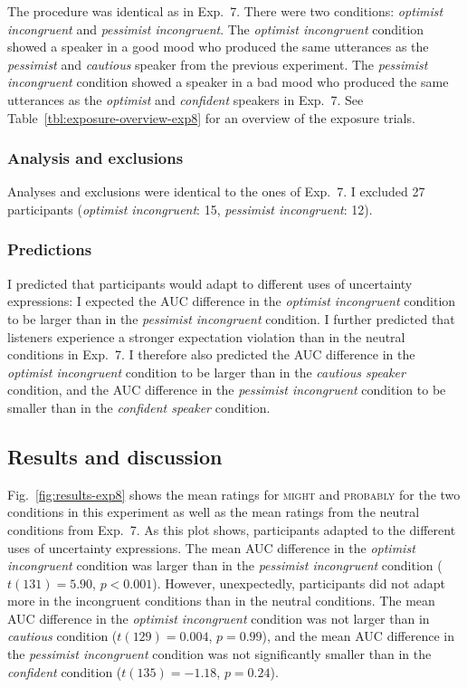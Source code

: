 The procedure was identical as in Exp.~7. There were two conditions: \textit{optimist incongruent} and \textit{pessimist incongruent}. The \textit{optimist incongruent} condition showed a speaker in a good mood who produced the same utterances as the \textit{pessimist} and \textit{cautious} speaker from the previous experiment. The \textit{pessimist incongruent} condition showed a speaker in a bad mood who produced the same utterances as the \textit{optimist} and \textit{confident} speakers in Exp.~7. See Table~\ref{tbl:exposure-overview-exp8} for an overview of the exposure trials.

\subsubsection{Analysis and exclusions}

Analyses and exclusions were identical to the ones of Exp.~7. I excluded 27 participants (\textit{optimist incongruent}: 15, \textit{pessimist incongruent}: 12).

\subsubsection{Predictions}

I predicted that participants would adapt to different uses of uncertainty expressions: I expected the AUC difference in the \textit{optimist incongruent} condition to be larger than in the \textit{pessimist incongruent} condition. I further predicted that listeners experience a stronger expectation violation than in the neutral conditions in Exp.~7. I therefore also predicted the AUC difference in the \textit{optimist incongruent} condition to be larger than in the \textit{cautious speaker} condition, and the AUC difference in the \textit{pessimist incongruent} condition to be smaller than in the \textit{confident speaker} condition.

\subsection{Results and discussion}

Fig.~\ref{fig:results-exp8} shows the mean ratings for \textsc{might} and \textsc{probably} for the two conditions in this experiment as well as the mean ratings from the neutral conditions from Exp.~7. As this plot shows, participants adapted to the different uses of uncertainty expressions. The mean AUC difference in the \textit{optimist incongruent} condition was larger than in the \textit{pessimist incongruent} condition ($t(131)=5.90$, $p<0.001$). However, unexpectedly, participants did not adapt more in the incongruent conditions than in the neutral conditions. The mean AUC difference in the \textit{optimist incongruent} condition was not larger than in \textit{cautious} condition ($t(129)=0.004$, $p=0.99$), and the mean AUC difference in the \textit{pessimist incongruent} condition was not significantly smaller than in the \textit{confident} condition ($t(135)=-1.18$, $p=0.24$).

